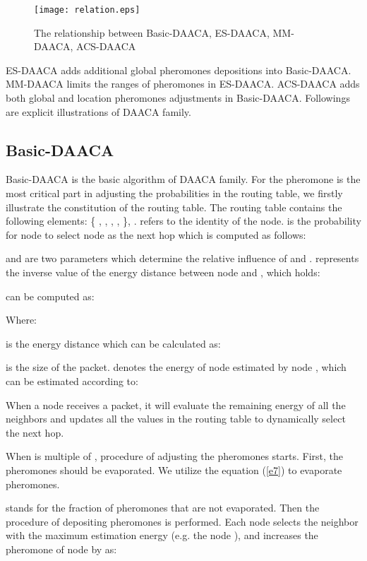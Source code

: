 \documentclass{elsarticle}
\begin{document}
\begin{figure}
\centering
\texttt{[image: relation.eps]}\\
  \caption{The relationship between Basic-DAACA, ES-DAACA, MM-DAACA, ACS-DAACA}\label{fig:relation}
\end{figure}

ES-DAACA adds additional global pheromones depositions into Basic-DAACA. MM-DAACA limits the ranges of pheromones in ES-DAACA. ACS-DAACA adds both global and location pheromones adjustments in Basic-DAACA. Followings are explicit illustrations of DAACA family.


\subsection{Basic-DAACA} \label{BasicDAACA}
Basic-DAACA is the basic algorithm of DAACA family. For the pheromone is the most critical part in adjusting the probabilities in the routing table, we firstly illustrate the constitution of the routing table. The routing table contains the following elements: \{ , , , ,  \}, .  refers to the identity of the node.  is the probability for node  to select node  as the next hop which is computed as follows:



 and  are two parameters which determine the relative influence of  and .  represents the inverse value of the energy distance  between node  and , which holds:



 can be computed as:


Where:




 is the energy distance which can be calculated as:


 is the size of the packet.   denotes the energy of node  estimated by node , which can be estimated according to:



When a node receives a packet, it will evaluate the remaining energy of all the neighbors and updates all the values in the routing table to dynamically select the next hop.

When  is multiple of , procedure of adjusting the pheromones starts. First, the pheromones should be evaporated. We utilize the equation (\ref{e7}) to evaporate pheromones.



 stands for the fraction of pheromones that are not evaporated. Then the procedure of depositing pheromones is performed. Each node selects the neighbor with the maximum estimation energy (e.g. the node ), and increases the pheromone of node  by  as:
\end{document}
